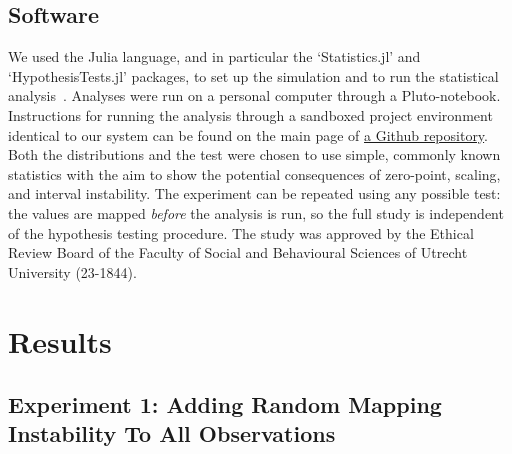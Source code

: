 \documentclass[titlepage, a4paper, 11pt]{article}
\begin{document}
\subsection{Software}
We used the Julia language, and in particular the `Statistics.jl' and `HypothesisTests.jl' packages, to set up the simulation and to run the statistical analysis~\citep{bezanson_julia_2017}. Analyses were run on a personal computer through a Pluto-notebook. Instructions for running the analysis through a sandboxed project environment identical to our system can be found on the main page of \href{https://github.com/MvanSteenbergen/MappingInstability}{a Github repository}. Both the distributions and the test were chosen to use simple, commonly known statistics with the aim to show the potential consequences of zero-point, scaling, and interval instability. The experiment can be repeated using any possible test: the values are mapped \textit{before} the analysis is run, so the full study is independent of the hypothesis testing procedure. The study was approved by the Ethical Review Board of the Faculty of Social and Behavioural Sciences of Utrecht University (23-1844).

\section{Results}
\subsection{Experiment 1: Adding Random Mapping Instability To All Observations}
\end{document}
